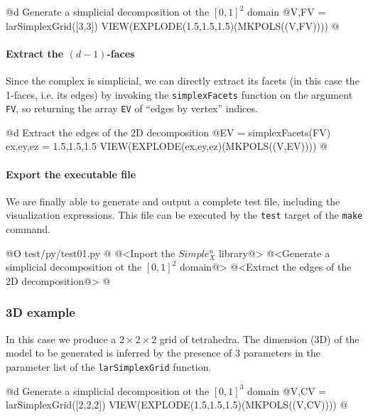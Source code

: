 \documentclass[11pt,oneside]{article}	%
\begin{document}
@d Generate a simplicial decomposition ot the $[0,1]^2$ domain
@{V,FV = larSimplexGrid([3,3])
VIEW(EXPLODE(1.5,1.5,1.5)(MKPOLS((V,FV))))
@}

\paragraph{Extract the $(d-1)$-faces}
Since the complex is simplicial, we can directly extract its facets (in this case the 1-faces, i.e. its edges) by invoking the \texttt{simplexFacets} function on the argument \texttt{FV}, so returning the array \texttt{EV} of ``edges by vertex'' indices. 

@d Extract the edges of the 2D decomposition
@{EV = simplexFacets(FV)
ex,ey,ez = 1.5,1.5,1.5
VIEW(EXPLODE(ex,ey,ez)(MKPOLS((V,EV))))
@}

\paragraph{Export the executable file}
We are finally able to generate and output a complete test file, including the visualization expressions. This file can be executed by the \texttt{test} target of the \texttt{make} command.

@O test/py/test01.py
@{
@<Inport the $Simple_X^n$ library@>
@<Generate a simplicial decomposition ot the $[0,1]^2$ domain@>
@<Extract the edges of the 2D decomposition@>
@}

\subsubsection{3D example}

In this case we produce a $2\times 2\times 2$ grid of tetrahedra. The dimension (3D) of the model to be generated is inferred by the presence of 3 parameters in the parameter list of the \texttt{larSimplexGrid} function. 

@d Generate a simplicial decomposition ot the $[0,1]^3$ domain
@{V,CV = larSimplexGrid([2,2,2])
VIEW(EXPLODE(1.5,1.5,1.5)(MKPOLS((V,CV))))
@}
\end{document}
